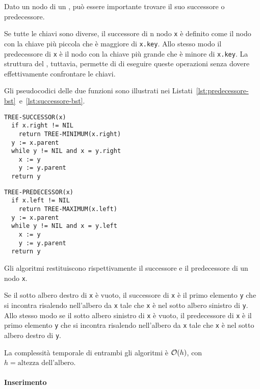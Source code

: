 \documentclass[italian, 10pt]{article}
\begin{document}
Dato un nodo di un \BST, può essere importante trovare il suo successore o predecessore.

Se tutte le chiavi sono diverse, il successore di n nodo \texttt{x} è definito come il nodo con la chiave più piccola che è maggiore di \texttt{x.key}.
Allo stesso modo il predecessore di \texttt{x} è il nodo con la chiave più grande che è minore di \texttt{x.key}.
La struttura del \BST, tuttavia, permette di di eseguire queste operazioni senza dovere effettivamente confrontare le chiavi.

Gli pseudocodici delle due funzioni sono illustrati nei Listati~\ref{lst:predecessore-bst}~e~\ref{lst:successore-bst}.

\begin{minipage}[t]{0.495\textwidth}
  \begin{lstlisting}[style=pseudocode, caption={Successore di di un nodo}, label={lst:successore-bst}]
TREE-SUCCESSOR(x)
  if x.right != NIL
    return TREE-MINIMUM(x.right)
  y := x.parent
  while y != NIL and x = y.right
    x := y
    y := y.parent
  return y
  \end{lstlisting}
\end{minipage}
\begin{minipage}[t]{0.495\textwidth}
  \begin{lstlisting}[style=pseudocode, caption={Successore di di un nodo}, label={lst:predecessore-bst}]
TREE-PREDECESSOR(x)
  if x.left != NIL
    return TREE-MAXIMUM(x.left)
  y := x.parent
  while y != NIL and x = y.left
    x := y
    y := y.parent
  return y
      \end{lstlisting}
\end{minipage}

Gli algoritmi restituiscono rispettivamente il successore e il predecessore di un nodo \texttt{x}.

\bigskip
Se il sotto albero destro di \texttt{x} è vuoto, il successore di \texttt{x} è il primo elemento \texttt{y} che si incontra risalendo nell'albero da \texttt{x} tale che \texttt{x} è nel sotto albero sinistro di \texttt{y}.
Allo stesso modo se il sotto albero sinistro di \texttt{x} è vuoto, il predecessore di \texttt{x} è il primo elemento \texttt{y} che si incontra risalendo nell'albero da \texttt{x} tale che \texttt{x} è nel sotto albero destro di \texttt{y}.

\bigskip
La complessità temporale di entrambi gli algoritmi è \(\mathcal{O}(h)\), con \(h = \text{altezza dell'albero}\).

\paragraph{Inserimento}
\label{par:inserimento-bst}
\end{document}
